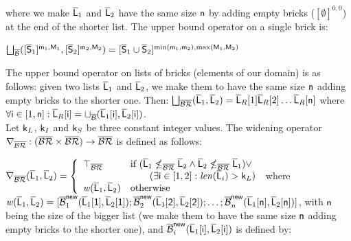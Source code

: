 \documentclass[orivec]{llncs}
\begin{document}
where we make $\ael{L}_1$ and $\ael{L}_2$ have the same size $\cel{n}$ by adding empty bricks ($[\emptyset]^{0,0}$) at the end of the shorter list. The upper bound operator on a single brick is:
 
$\bigsqcup_{\asinglebrick}([\aset{S}_1]^{\cel{m}_1,\cel{M}_1}, [\aset{S}_2]^{\cel{m}_2,\cel{M}_2}) = [\aset{S}_1 \cup \aset{S}_2]^{\min(\cel{m}_1,\cel{m}_2), \max(\cel{M}_1,\cel{M}_2)}$

The upper bound operator on lists of bricks (elements of our domain) is as follows: given two lists $\ael{L}_1$ and $\ael{L}_2$, we make them to have the same size $\cel{n}$ adding empty bricks to the shorter one. Then: $\bigsqcup_{\abricks}(\ael{L}_1,\ael{L}_2) = \ael{L}_R[1]\ael{L}_R[2]\dots \ael{L}_R[\cel{n}]$ where $\forall \cel{i} \in [1,\cel{n}] : \ael{L}_R[\cel{i}] = \sqcup_{\asinglebrick}(\ael{L}_1[\cel{i}], \ael{L}_2[\cel{i}])$.\\
Let $\cel{k}_L$, $\cel{k}_I$ and $\cel{k}_S$ be three constant integer values. The widening operator $\nabla_{\abricks} : (\abricks \times \abricks) \to \abricks$ is defined as follows: 
 
$
\nabla_{\abricks}(\ael{L}_1, \ael{L}_2) = \left\{ 
\begin{array}{ll}
\top_{\abricks} & \mbox{if } (\ael{L}_1 \nleq_{\abricks} \ael{L}_2 \land \ael{L}_2 \nleq_{\abricks} \ael{L}_1) \lor\\
& \hspace{20pt} (\exists \cel{i} \in [1,2] : \stringlength{\ael{L}_i} > \cel{k}_L)\\
\cfunction{w}(\ael{L}_1,\ael{L}_2) & \mbox{otherwise}
\end{array}\right. 
$
where $\cfunction{w}(\aset{L}_1,\aset{L}_2) = [\asinglebrick_1^{\cel{new}}(\ael{L}_1[\cel{1}], \ael{L}_2[\cel{1}]) ; \asinglebrick_2^{\cel{new}}(\ael{L}_1[\cel{2}], \ael{L}_2[\cel{2}]); \dots ; \asinglebrick_n^{\cel{new}}(\ael{L}_1[\cel{n}], \ael{L}_2[\cel{n}])]$, \allowbreak with $\cel{n}$ being the size of the bigger list (we make them to have the same size $\cel{n}$ adding empty bricks to the shorter one), and $\asinglebrick_i^{\cel{new}}(\ael{L}_1[\cel{i}], \ael{L}_2[\cel{i}])$ is defined by:
 
\end{document}
